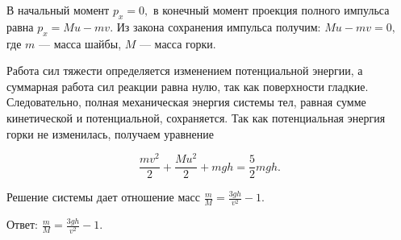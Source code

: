 \documentclass[12pt,a4paper]{article}
\begin{document}
{В начальный момент $p_x=0,$ в конечный момент проекция полного импульса равна $p_x=Mu - m v .$ Из закона сохранения импульса получим: $Mu - m v =0,$ где $m$ — масса шайбы, $M$ — масса горки. 

Работа сил тяжести определяется изменением потенциальной энергии, а суммарная работа сил реакции равна нулю, так как поверхности гладкие. Следовательно, полная механическая энергия системы тел, равная сумме кинетической и потенциальной, сохраняется. Так как потенциальная энергия горки не изменилась, получаем уравнение 

\[\frac{m v ^{2}}{2} + \frac{Mu ^{2}}{2} + mgh= \frac{5}{2} mgh.\]

Решение системы дает отношение масс $\frac{m}{M} = \frac{3gh}{v ^{2}} - 1.$

Ответ: $\frac{m}{M} = \frac{3gh}{v ^{2}} - 1.$
}
\end{document}
